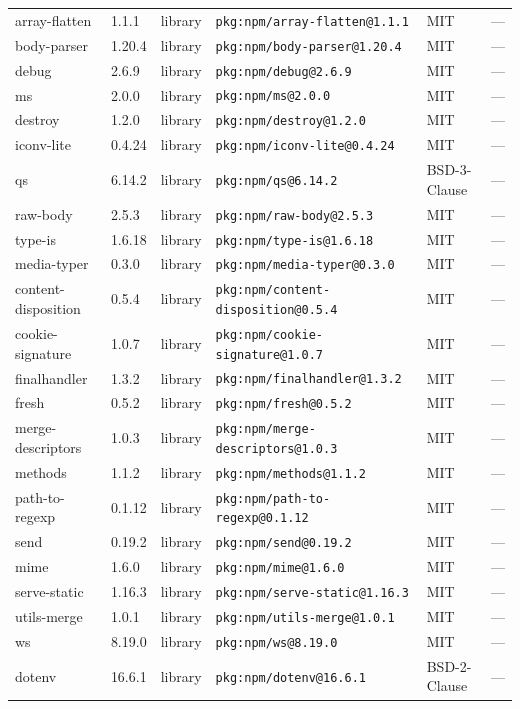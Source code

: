 \documentclass[11pt]{article}
\begin{document}
\begin{longtable}{|l|l|l|p{2.2cm}|l|p{4cm}|}
array-flatten & 1.1.1 & library & \texttt{pkg:npm/array-flatten@1.1.1} & MIT & — \\
body-parser & 1.20.4 & library & \texttt{pkg:npm/body-parser@1.20.4} & MIT & — \\
debug & 2.6.9 & library & \texttt{pkg:npm/debug@2.6.9} & MIT & — \\
ms & 2.0.0 & library & \texttt{pkg:npm/ms@2.0.0} & MIT & — \\
destroy & 1.2.0 & library & \texttt{pkg:npm/destroy@1.2.0} & MIT & — \\
iconv-lite & 0.4.24 & library & \texttt{pkg:npm/iconv-lite@0.4.24} & MIT & — \\
qs & 6.14.2 & library & \texttt{pkg:npm/qs@6.14.2} & BSD-3-Clause & — \\
raw-body & 2.5.3 & library & \texttt{pkg:npm/raw-body@2.5.3} & MIT & — \\
type-is & 1.6.18 & library & \texttt{pkg:npm/type-is@1.6.18} & MIT & — \\
media-typer & 0.3.0 & library & \texttt{pkg:npm/media-typer@0.3.0} & MIT & — \\
content-disposition & 0.5.4 & library & \texttt{pkg:npm/content-disposition@0.5.4} & MIT & — \\
cookie-signature & 1.0.7 & library & \texttt{pkg:npm/cookie-signature@1.0.7} & MIT & — \\
finalhandler & 1.3.2 & library & \texttt{pkg:npm/finalhandler@1.3.2} & MIT & — \\
fresh & 0.5.2 & library & \texttt{pkg:npm/fresh@0.5.2} & MIT & — \\
merge-descriptors & 1.0.3 & library & \texttt{pkg:npm/merge-descriptors@1.0.3} & MIT & — \\
methods & 1.1.2 & library & \texttt{pkg:npm/methods@1.1.2} & MIT & — \\
path-to-regexp & 0.1.12 & library & \texttt{pkg:npm/path-to-regexp@0.1.12} & MIT & — \\
send & 0.19.2 & library & \texttt{pkg:npm/send@0.19.2} & MIT & — \\
mime & 1.6.0 & library & \texttt{pkg:npm/mime@1.6.0} & MIT & — \\
serve-static & 1.16.3 & library & \texttt{pkg:npm/serve-static@1.16.3} & MIT & — \\
utils-merge & 1.0.1 & library & \texttt{pkg:npm/utils-merge@1.0.1} & MIT & — \\
ws & 8.19.0 & library & \texttt{pkg:npm/ws@8.19.0} & MIT & — \\
dotenv & 16.6.1 & library & \texttt{pkg:npm/dotenv@16.6.1} & BSD-2-Clause & — \\

\end{longtable}
\end{document}
